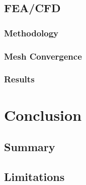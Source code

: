 \documentclass[10pt]{article}
\begin{document}
\subsection{FEA/CFD} %

\subsubsection{Methodology}

\subsubsection{Mesh Convergence}

\subsubsection{Results}

\section{Conclusion}

\subsection{Summary}

\subsection{Limitations} \label{sec:limitations}
\end{document}
